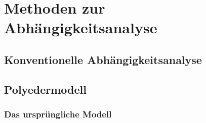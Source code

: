 
\section{Methoden zur Abhängigkeitsanalyse}
\subsection{Konventionelle Abhängigkeitsanalyse}
\subsection{Polyedermodell}

\subsubsection{Das ursprüngliche Modell}
\label{sec:orig-mod}

